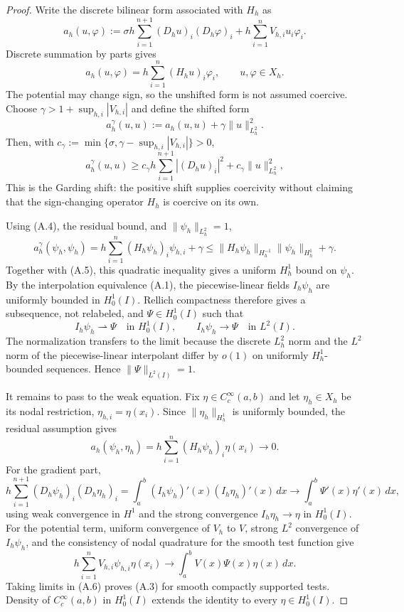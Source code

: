 \begin{proof}
Write the discrete bilinear form associated with $H_h$ as
\[
  a_h(u,\varphi)
  :=
  \sigma h\sum_{i=1}^{n+1}(D_hu)_i(D_h\varphi)_i
  +
  h\sum_{i=1}^n V_{h,i}u_i\varphi_i .
\]
Discrete summation by parts gives
\[
  a_h(u,\varphi)
  =
  h\sum_{i=1}^n (H_hu)_i\varphi_i,
  \qquad u,\varphi\in X_h .
  \tag{A.4}
\]
The potential may change sign, so the unshifted form is not assumed coercive.
Choose $\gamma>1+\sup_{h,i}|V_{h,i}|$ and define the shifted form
\[
  a_h^\gamma(u,u)
  :=
  a_h(u,u)+\gamma\|u\|_{L_h^2}^2 .
\]
Then, with $c_\gamma:=\min\{\sigma,\gamma-\sup_{h,i}|V_{h,i}|\}>0$,
\[
  a_h^\gamma(u,u)
  \ge
  c_\gamma h\sum_{i=1}^{n+1}|(D_hu)_i|^2
  +
  c_\gamma\|u\|_{L_h^2}^2 ,
  \tag{A.5}
\]
This is the Garding shift: the positive shift supplies coercivity without
claiming that the sign-changing operator $H_h$ is coercive on its own.

Using (A.4), the residual bound, and $\|\psi_h\|_{L_h^2}=1$,
\[
  a_h^\gamma(\psi_h,\psi_h)
  =
  h\sum_{i=1}^n (H_h\psi_h)_i\psi_{h,i}
  +
  \gamma
  \le
  \|H_h\psi_h\|_{H_h^{-1}}\|\psi_h\|_{H_h^1}
  +
  \gamma .
\]
Together with (A.5), this quadratic inequality gives a uniform
$H_h^1$ bound on $\psi_h$.  By the interpolation equivalence (A.1), the
piecewise-linear fields $I_h\psi_h$ are uniformly bounded in $H_0^1(I)$.
Rellich compactness therefore gives a subsequence, not relabeled, and
$\Psi\in H_0^1(I)$ such that
\[
  I_h\psi_h\rightharpoonup \Psi \quad\text{in }H_0^1(I),
  \qquad
  I_h\psi_h\to \Psi \quad\text{in }L^2(I).
\]
The normalization transfers to the limit because the discrete $L_h^2$ norm and
the $L^2$ norm of the piecewise-linear interpolant differ by $o(1)$ on
uniformly $H_h^1$-bounded sequences.  Hence $\|\Psi\|_{L^2(I)}=1$.

It remains to pass to the weak equation.  Fix $\eta\in C_c^\infty(a,b)$ and
let $\eta_h\in X_h$ be its nodal restriction, $\eta_{h,i}=\eta(x_i)$.  Since
$\|\eta_h\|_{H_h^1}$ is uniformly bounded, the residual assumption gives
\[
  a_h(\psi_h,\eta_h)
  =
  h\sum_{i=1}^n (H_h\psi_h)_i\eta(x_i)
  \to 0 .
  \tag{A.6}
\]
For the gradient part,
\[
  h\sum_{i=1}^{n+1}(D_h\psi_h)_i(D_h\eta_h)_i
  =
  \int_a^b (I_h\psi_h)'(x)(I_h\eta_h)'(x)\,dx
  \to
  \int_a^b \Psi'(x)\eta'(x)\,dx,
\]
using weak convergence in $H^1$ and the strong convergence
$I_h\eta_h\to\eta$ in $H_0^1(I)$.  For the potential term, uniform convergence
of $V_h$ to $V$, strong $L^2$ convergence of $I_h\psi_h$, and the consistency
of nodal quadrature for the smooth test function give
\[
  h\sum_{i=1}^n V_{h,i}\psi_{h,i}\eta(x_i)
  \to
  \int_a^b V(x)\Psi(x)\eta(x)\,dx .
\]
Taking limits in (A.6) proves (A.3) for smooth compactly supported tests.
Density of $C_c^\infty(a,b)$ in $H_0^1(I)$ extends the identity to every
$\eta\in H_0^1(I)$.
\end{proof}

